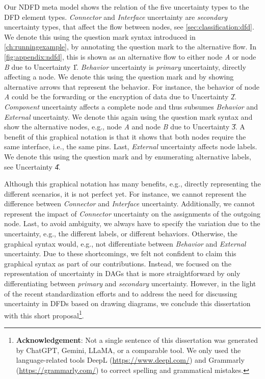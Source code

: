 Our \ac{NDFD} meta model shows the relation of the five uncertainty types to the \ac{DFD} element types.
\emph{Connector} and \emph{Interface} uncertainty are \emph{secondary} uncertainty types, that affect the flow between nodes, see \autoref{sec:classification:dfd}.
We denote this using the question mark syntax introduced in \autoref{ch:runningexample}, by annotating the question mark to the alternative flow.
In \autoref{fig:appendix:ndfd}, this is shown as an alternative flow to either node \emph{A} or node \emph{B} due to Uncertainty \U{1}.
\emph{Behavior} uncertainty is \emph{primary} uncertainty, directly affecting a node.
We denote this using the question mark and by showing alternative arrows that represent the behavior.
For instance, the behavior of node \emph{A} could be the forwarding or the encryption of data due to Uncertainty \U{2}.
\emph{Component} uncertainty affects a complete node and thus subsumes \emph{Behavior} and \emph{External} uncertainty.
We denote this again using the question mark syntax and show the alternative nodes, e.g., node \emph{A} and node \emph{B} due to Uncertainty \U{3}.
A benefit of this graphical notation is that it shows that both nodes require the same interface, i.e., the same pins.
Last, \emph{External} uncertainty affects node labels.
We denote this using the question mark and by enumerating alternative labels, see Uncertainty \U{4}.

Although this graphical notation has many benefits, e.g., directly representing the different scenarios, it is not perfect yet.
For instance, we cannot represent the difference between \emph{Connector} and \emph{Interface} uncertainty.
Additionally, we cannot represent the impact of \emph{Connector} uncertainty on the assignments of the outgoing node.
Last, to avoid ambiguity, we always have to specify the variation due to the uncertainty, e.g., the different labels, or different behaviors.
Otherwise, the graphical syntax would, e.g., not differentiate between \emph{Behavior} and \emph{External} uncertainty.
Due to these shortcomings, we felt not confident to claim this graphical syntax as part of our contributions.
Instead, we focused on the representation of uncertainty in \acp{DAG} that is more straightforward by only differentiating between \emph{primary} and \emph{secondary} uncertainty.
However, in the light of the recent standardization efforts \cite{PSUM} and to address the need for discussing uncertainty in \acp{DFD} based on drawing diagrams, we conclude this dissertation with this short proposal\footnote{%
\textbf{Acknowledgement}: Not a single sentence of this dissertation was generated by ChatGPT, Gemini, LLaMA, or a comparable tool.
We only used the language-related tools DeepL (\href{https://www.deepl.com/}{https://www.deepl.com/}) and Grammarly (\href{https://grammarly.com/}{https://grammarly.com/}) to correct spelling and grammatical mistakes.}.
